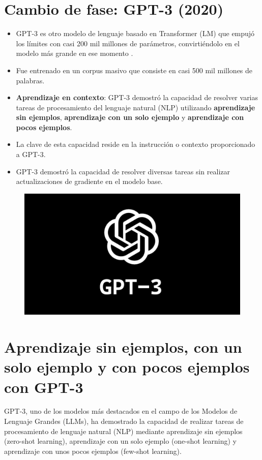 \section{Cambio de fase: GPT-3 (2020)}
\begin{itemize}
\item GPT-3 es otro modelo de lenguaje basado en Transformer (LM) que empujó los límites con casi 200 mil millones de parámetros, convirtiéndolo en el modelo más grande en ese momento \cite{brown2020language}.
\item Fue entrenado en un corpus masivo que consiste en casi 500 mil millones de palabras.
\item \textbf{Aprendizaje en contexto}: GPT-3 demostró la capacidad de resolver varias tareas de procesamiento del lenguaje natural (NLP) utilizando \textbf{aprendizaje sin ejemplos}, \textbf{aprendizaje con un solo ejemplo} y \textbf{aprendizaje con pocos ejemplos}.
\item La clave de esta capacidad reside en la instrucción o contexto proporcionado a GPT-3.
\item GPT-3 demostró la capacidad de resolver diversas tareas sin realizar actualizaciones de gradiente en el modelo base.
\end{itemize}

 \begin{figure}[h]
        	\includegraphics[scale = 0.08]{pics/gpt3.png}
        \end{figure}




\section{Aprendizaje sin ejemplos, con un solo ejemplo y con pocos ejemplos con GPT-3}
GPT-3, uno de los modelos más destacados en el campo de los Modelos de Lenguaje Grandes (LLMs), ha demostrado la capacidad de realizar tareas de procesamiento de lenguaje natural (NLP) mediante aprendizaje sin ejemplos (zero-shot learning), aprendizaje con un solo ejemplo (one-shot learning) y aprendizaje con unos pocos ejemplos (few-shot learning).

